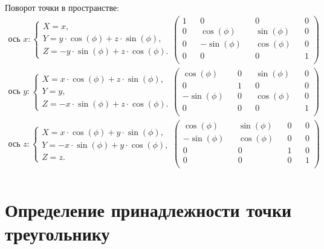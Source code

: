 Поворот точки в пространстве:
\begin{align*}
	\text{ось } x: 
	\begin{cases}
		X = x, \\
		Y = y \cdot \cos(\phi) + z \cdot \sin(\phi), \\
		Z = - y \cdot \sin(\phi) + z \cdot \cos(\phi).
	\end{cases}
	\begin{pmatrix}
		1 && 0 && 0 && 0 \\
		0 && \cos(\phi) && \sin(\phi) && 0 \\
		0 && -\sin(\phi) && \cos(\phi) && 0 \\
		0 && 0 && 0 && 1 \\
	\end{pmatrix} \\
	\text{ось }  y: 
	\begin{cases}
		X = x \cdot \cos(\phi) + z \cdot \sin(\phi), \\
		Y = y, \\
		Z = - x \cdot \sin(\phi) + z \cdot \cos(\phi).
	\end{cases}
	\begin{pmatrix}
		\cos(\phi) && 0 && \sin(\phi) && 0 \\
		0 && 1 && 0 && 0 \\
		-\sin(\phi) && 0 && \cos(\phi) && 0 \\
		0 && 0 && 0 && 1 \\
	\end{pmatrix} \\
	\text{ось }  z: 
	\begin{cases}
		X = x \cdot \cos(\phi) + y \cdot \sin(\phi), \\
		Y = - x \cdot \sin(\phi) + y \cdot \cos(\phi), \\
		Z = z.
	\end{cases}
	\begin{pmatrix}
		\cos(\phi) && \sin(\phi) && 0 && 0 \\
		-\sin(\phi) && \cos(\phi) && 0 && 0 \\
		0 && 0 && 1 && 0 \\
		0 && 0 && 0 && 1 \\
	\end{pmatrix} \\
\end{align*}


\section{Определение принадлежности точки треугольнику}

